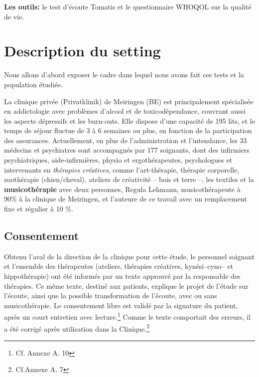 \textbf{Les outils:} le test d'écoute Tomatis et le questionnaire WHOQOL sur la qualité de vie.


 
 
 \section{Description du setting}
 Nous allons
 d'abord exposer le cadre dans lequel nous avons fait ces tests et la
 population étudiée.
 
 La clinique privée (Privatklinik)
 de Meiringen (BE) est  principalement spécialisée en
 addictologie avec problèmes d'alcool et de toxicodépendance, couvrant aussi les aspects dépressifs
 et les
 burn-outs.
 Elle dispose d'une capacité de 195 lits, et le temps de séjour fluctue de 3 à 6 semaines ou plus, en
 fonction de la participation des assurances.
Actuellement, en plus de l'administration et l'intendance, les 33
 médecins et psychiatres sont
 accompagnés par 177
 soignants, dont des infirmiers psychiatriques, aide-infirmières, physio et
 ergothérapeutes,
 psychologues et intervenants en \textit{thérapies
 créatives}, comme l'art-thérapie, thérapie
 corporelle, zoothérapie (chien/cheval),  ateliers de créativité --
 bois et terre --,  les textiles et la\textbf{ musicothérapie} avec deux
 personnes, Regula Lehmann, musicothérapeute  à 90\%  à la clinique de Meiringen, et  l'auteure de ce 
 travail avec un remplacement fixe et régulier à 10 \%.
 
 \subsection{Consentement}
 Obtenu l'aval de la direction de la
 clinique pour cette étude,  le personnel soignant et l'ensemble des
 thérapeutes (ateliers, thérapies créatives, kynési--cyno--
 et hippothérapie) ont été  informés par un texte approuvé par la responsable des thérapies.
 Ce même texte, destiné aux
 patients, explique le projet de l'étude sur l'écoute, ainsi que la possible transformation de l'écoute,
 avec ou sans musicothérapie.
 Le consentement libre est validé par la signature du patient, après
 un court entretien avec lecture.\footnote{Cf. Annexe A. 10}
 Comme le texte comportait des erreurs, il a été 
 corrigé après utilisation dans la Clinique.\footnote{Cf.Annexe A. 7}
 
